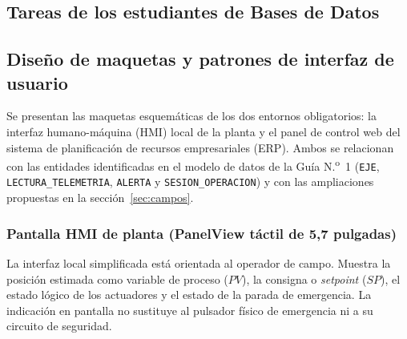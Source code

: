 \documentclass[11pt]{article}
\newcommand{\campo}[1]{\nolinkurl{#1}}
\begin{document}
\begin{enumerate}[leftmargin=1.4em]
	
	
	\newpage
	\section{Tareas de los estudiantes de Bases de Datos}
	\subsection{Diseño de maquetas y patrones de interfaz de usuario}
	Se presentan las maquetas esquemáticas de los dos entornos obligatorios: la interfaz humano-máquina (HMI) local de la planta y el panel de control web del sistema de planificación de recursos empresariales (ERP). Ambos se relacionan con las entidades identificadas en el modelo de datos de la Guía N.\textsuperscript{o}~1 (\campo{EJE}, \campo{LECTURA_TELEMETRIA}, \campo{ALERTA} y \campo{SESION_OPERACION}) y con las ampliaciones propuestas en la sección~\ref{sec:campos}.
	
	\subsubsection{Pantalla HMI de planta (PanelView táctil de 5,7 pulgadas)}
	
	La interfaz local simplificada está orientada al operador de campo. Muestra la posición estimada como variable de proceso ($PV$), la consigna o \textit{setpoint} ($SP$), el estado lógico de los actuadores y el estado de la parada de emergencia. La indicación en pantalla no sustituye al pulsador físico de emergencia ni a su circuito de seguridad.
	
	\begin{center}
\end{center}
\end{enumerate}
\end{document}

